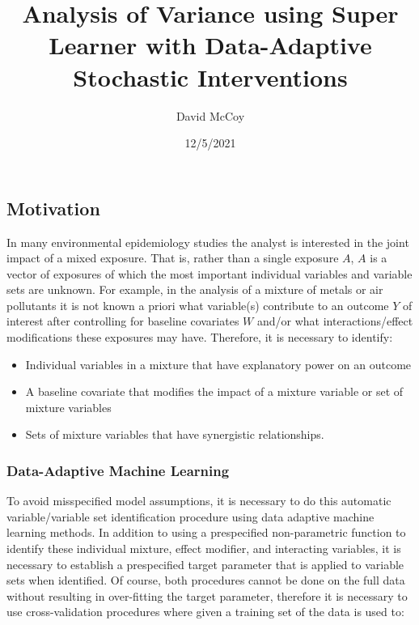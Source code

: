 \documentclass[
]{article}
\title{Analysis of Variance using Super Learner with Data-Adaptive
Stochastic Interventions}
\author{David McCoy}
\date{12/5/2021}
\providecommand{\tightlist}{%
  \setlength{\itemsep}{0pt}\setlength{\parskip}{0pt}}
\begin{document}
\maketitle

\hypertarget{motivation}{%
\subsection{Motivation}\label{motivation}}

In many environmental epidemiology studies the analyst is interested in
the joint impact of a mixed exposure. That is, rather than a single
exposure \(A\), \(A\) is a vector of exposures of which the most
important individual variables and variable sets are unknown. For
example, in the analysis of a mixture of metals or air pollutants it is
not known a priori what variable(s) contribute to an outcome \(Y\) of
interest after controlling for baseline covariates \(W\) and/or what
interactions/effect modifications these exposures may have. Therefore,
it is necessary to identify:

\begin{itemize}
\tightlist
\item
  Individual variables in a mixture that have explanatory power on an
  outcome
\item
  A baseline covariate that modifies the impact of a mixture variable or
  set of mixture variables
\item
  Sets of mixture variables that have synergistic relationships.
\end{itemize}

\hypertarget{data-adaptive-machine-learning}{%
\subsubsection{Data-Adaptive Machine
Learning}\label{data-adaptive-machine-learning}}

To avoid misspecified model assumptions, it is necessary to do this
automatic variable/variable set identification procedure using data
adaptive machine learning methods. In addition to using a prespecified
non-parametric function to identify these individual mixture, effect
modifier, and interacting variables, it is necessary to establish a
prespecified target parameter that is applied to variable sets when
identified. Of course, both procedures cannot be done on the full data
without resulting in over-fitting the target parameter, therefore it is
necessary to use cross-validation procedures where given a training set
of the data is used to:
\end{document}
